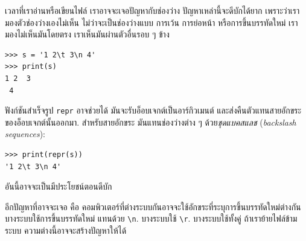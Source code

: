 
เวลาที่เราอ่านหรือเขียนไฟล์
เราอาจจะเจอปัญหากับช่องว่าง
ปัญหาเหล่านี้จะดีบักได้ยาก 
เพราะว่าเรามองตัวช่องว่างเองไม่เห็น
ไม่ว่าจะเป็นช่องว่างแบบ การเว้น การย่อหน้า หรือการขึ้นบรรทัดใหม่
เรามองไม่เห็นมันโดยตรง เราเห็นมันผ่านตัวอื่นรอบ ๆ ข้าง

\begin{verbatim}
>>> s = '1 2\t 3\n 4'
>>> print(s)
1 2	 3
 4
\end{verbatim}


ฟังก์ชันสำเร็จรูป \texttt{repr} อาจช่วยได้
มันจะรับอ็อบเจกต์เป็นอาร์กิวเมนต์
และส่งคืนตัวแทนสายอักขระของอ็อบเจกต์นั้นออกมา.
สำหรับสายอักขระ
มันแทนช่องว่างต่าง ๆ ด้วย\textit{ชุดแบคสแลช} (\textit{backslash sequences}):

\begin{verbatim}
>>> print(repr(s))
'1 2\t 3\n 4'
\end{verbatim}

อันนี้อาจจะเป็นมีประโยชน์ตอนดีบัก


อีกปัญหาที่อาจจะเจอ คือ
คอมพิวเตอร์ที่ต่างระบบกันอาจจะใช้อักขระที่ระบุการขึ้นบรรทัดใหม่ต่างกัน
บางระบบใช้การขึ้นบรรทัดใหม่ แทนด้วย \verb|\n|.
บางระบบใช้ \verb|\r|.
บางระบบใช้ทั้งคู่
ถ้าเราย้ายไฟล์ข้ามระบบ
ความต่างนี้อาจจะสร้างปัญหาให้ได้


